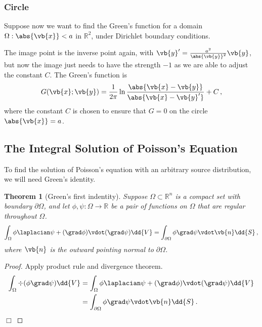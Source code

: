 \documentclass{article}
\theoremstyle{plain}\theoremheaderfont{\normalfont\itshape}\theorembodyfont{\rmfamily}\theoremseparator{.}\newtheorem*{rem}{Remark}\newtheorem*{ex}{Example}\newtheorem*{proof}{Proof}\newtheorem*{altp}{Alternative proof}
\theoremstyle{plain}\theoremheaderfont{\normalfont\bfseries}\theorembodyfont{\rmfamily}\theoremseparator{.}\newtheorem{thm}{Theorem}[section]\newtheorem{lem}[thm]{Lemma}\newtheorem{prop}[thm]{Proposition}\newtheorem*{cor}{Corollary}\newtheorem{defn}[thm]{Definition}\newtheorem{clm}[thm]{Claim}\newtheorem{clminproof}{Claim}
\theoremstyle{break}\theoremheaderfont{\normalfont\itshape}\theorembodyfont{\rmfamily}\theoremseparator{.\medskip}\newtheorem*{proofskip}{Proof}\newtheorem*{exs}{Examples}\newtheorem*{rems}{Remarks}
\theoremstyle{break}\theoremheaderfont{\normalfont\bfseries}\theorembodyfont{\rmfamily}\theoremseparator{.\medskip}\newtheorem{lemskip}[thm]{Lemma}\newtheorem{defnskip}[thm]{Definition}\newtheorem{propskip}[thm]{Proposition}\newtheorem{thmskip}[thm]{Theorem}
\numberwithin{equation}{section}
\newcommand{\qed}{\hfill\ensuremath{\Box}}
\begin{document}
	\subsubsection{Circle}
	Suppose now we want to find the Green's function for a domain \(\Omega:\abs{\vb{x}}<a\) in \(\mathbb{R}^2\), under Dirichlet boundary conditions.

	The image point is the inverse point again, with \(\vb{y}'=\frac{a^2}{\abs{\vb{y}}^2}\vb{y}\), but now the image just needs to have the strength \(-1\) as we are able to adjust the constant \(C\). The Green's function is
	\[G(\vb{x};\vb{y})=\frac{1}{2\pi}\ln\frac{\abs{\vb{x}-\vb{y}}}{\abs{\vb{x}-\vb{y}'}}+C\,,\]
	where the constant \(C\) is chosen to ensure that \(G=0\) on the circle \(\abs{\vb{x}}=a\).

	\subsection{The Integral Solution of Poisson's Equation}
	To find the solution of Poisson's equation with an arbitrary source distribution, we will need Green's identity.

	\begin{thm}[Green's first indentity]
		Suppose \(\Omega\subset\mathbb{R}^n\) is a compact set with boundary \(\partial\Omega\), and let \(\phi,\psi:\Omega\to\mathbb{R}\) be a pair of functions on \(\Omega\) that are regular throughout \(\Omega\).
		\[\int_\Omega\phi\laplacian\psi+(\grad\phi)\vdot(\grad\psi)\dd{V}=\int_{\partial\Omega}\phi\grad\psi\vdot\vb{n}\dd{S}\,,\]
		where \(\vb{n}\) is the outward pointing normal to \(\partial\Omega\).
	\end{thm}
	\begin{proof}
		Apply product rule and divergence theorem.
		\begin{align*}
			\int_\Omega\div(\phi\grad\psi)\dd{V}&=\int_\Omega\phi\laplacian\psi+(\grad\phi)\vdot(\grad\psi)\dd{V}\\
			&=\int_{\partial\Omega}\phi\grad\psi\vdot\vb{n}\dd{S}\,.
		\end{align*}\qed
	\end{proof}
\end{document}

